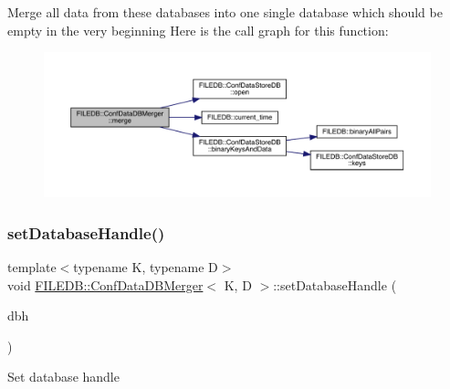 Merge all data from these databases into one single database which should be empty in the very beginning Here is the call graph for this function\+:
\nopagebreak
\begin{figure}[H]
\begin{center}
\leavevmode
\includegraphics[width=350pt]{db/d60/classFILEDB_1_1ConfDataDBMerger_a6738f9880645518ba94eccd3b2037f24_cgraph}
\end{center}
\end{figure}
\mbox{\label{classFILEDB_1_1ConfDataDBMerger_aba7a50569bcdc1beca3b82536fa5922b}} 
\subsubsection{\texorpdfstring{setDatabaseHandle()}{setDatabaseHandle()}\hspace{0.1cm}{\footnotesize\ttfamily [1/2]}}
{\footnotesize\ttfamily template$<$typename K, typename D$>$ \\
void \mbox{\hyperlink{classFILEDB_1_1ConfDataDBMerger}{F\+I\+L\+E\+D\+B\+::\+Conf\+Data\+D\+B\+Merger}}$<$ K, D $>$\+::set\+Database\+Handle (\begin{DoxyParamCaption}\item[{\mbox{\hyperlink{classFILEDB_1_1AllConfStoreDB}{All\+Conf\+Store\+DB}}$<$ K, D $>$ $\ast$}]{dbh }\end{DoxyParamCaption})\hspace{0.3cm}{\ttfamily [inline]}}

Set database handle \mbox{\label{classFILEDB_1_1ConfDataDBMerger_aba7a50569bcdc1beca3b82536fa5922b}} 
